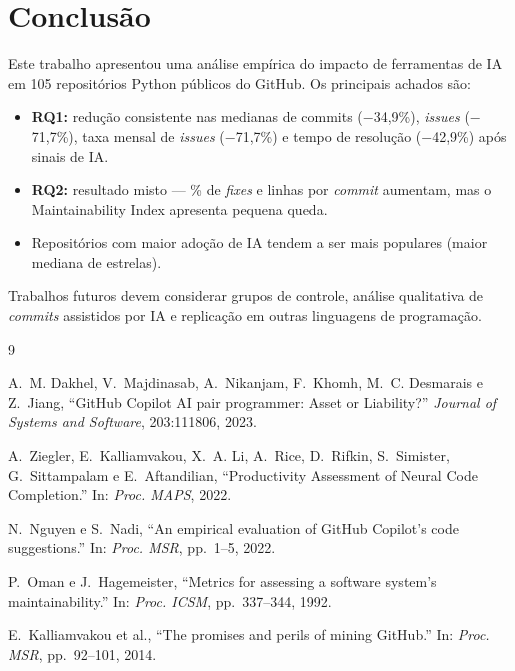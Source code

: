 \documentclass[12pt,a4paper,twocolumn]{article}
\begin{document}
\section{Conclusão}

Este trabalho apresentou uma análise empírica do impacto de ferramentas de IA em 105
repositórios Python públicos do GitHub. Os principais achados são:

\begin{itemize}[leftmargin=1.2em, itemsep=2pt]
  \item \textbf{RQ1:} redução consistente nas medianas de commits ($-$34,9\%),
    \textit{issues} ($-$71,7\%), taxa mensal de \textit{issues} ($-$71,7\%) e tempo
    de resolução ($-$42,9\%) após sinais de IA.
  \item \textbf{RQ2:} resultado misto --- \% de \textit{fixes} e linhas por
    \textit{commit} aumentam, mas o Maintainability Index apresenta pequena queda.
  \item Repositórios com maior adoção de IA tendem a ser mais populares (maior
    mediana de estrelas).
\end{itemize}

Trabalhos futuros devem considerar grupos de controle, análise qualitativa de
\textit{commits} assistidos por IA e replicação em outras linguagens de programação.


\begin{thebibliography}{9}

  A.~M. Dakhel, V.~Majdinasab, A.~Nikanjam, F.~Khomh, M.~C. Desmarais e Z.~Jiang,
  ``GitHub Copilot AI pair programmer: Asset or Liability?''
  \textit{Journal of Systems and Software}, 203:111806, 2023.

  A.~Ziegler, E.~Kalliamvakou, X.~A. Li, A.~Rice, D.~Rifkin,
  S.~Simister, G.~Sittampalam e E.~Aftandilian,
  ``Productivity Assessment of Neural Code Completion.''
  In: \textit{Proc. MAPS}, 2022.

  N.~Nguyen e S.~Nadi,
  ``An empirical evaluation of GitHub Copilot's code suggestions.''
  In: \textit{Proc. MSR}, pp.\ 1--5, 2022.

  P.~Oman e J.~Hagemeister,
  ``Metrics for assessing a software system's maintainability.''
  In: \textit{Proc. ICSM}, pp.\ 337--344, 1992.

  E.~Kalliamvakou et al.,
  ``The promises and perils of mining GitHub.''
  In: \textit{Proc. MSR}, pp.\ 92--101, 2014.

\end{thebibliography}
\end{document}
